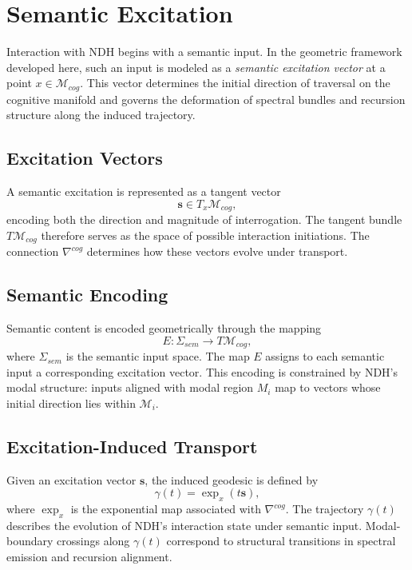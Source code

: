 \section{Semantic Excitation}
\label{sec:semantic-excitation}

Interaction with NDH begins with a semantic input. In the geometric framework
developed here, such an input is modeled as a \emph{semantic excitation vector}
at a point $x \in \mathcal{M}_{cog}$. This vector determines the initial
direction of traversal on the cognitive manifold and governs the deformation of
spectral bundles and recursion structure along the induced trajectory.

\subsection{Excitation Vectors}

A semantic excitation is represented as a tangent vector
\[
\mathbf{s} \in T_x \mathcal{M}_{cog},
\]
encoding both the direction and magnitude of interrogation. The tangent bundle
$T\mathcal{M}_{cog}$ therefore serves as the space of possible interaction
initiations. The connection $\nabla^{cog}$ determines how these vectors evolve
under transport.

\subsection{Semantic Encoding}

Semantic content is encoded geometrically through the mapping
\[
E : \Sigma_{sem} \to T\mathcal{M}_{cog},
\]
where $\Sigma_{sem}$ is the semantic input space. The map $E$ assigns to each
semantic input a corresponding excitation vector. This encoding is constrained
by NDH's modal structure: inputs aligned with modal region $M_i$ map to vectors
whose initial direction lies within $\mathcal{M}_i$.

\subsection{Excitation-Induced Transport}

Given an excitation vector $\mathbf{s}$, the induced geodesic is defined by
\[
\gamma(t) = \exp_x(t\mathbf{s}),
\]
where $\exp_x$ is the exponential map associated with $\nabla^{cog}$. The
trajectory $\gamma(t)$ describes the evolution of NDH's interaction state under
semantic input. Modal-boundary crossings along $\gamma(t)$ correspond to
structural transitions in spectral emission and recursion alignment.

